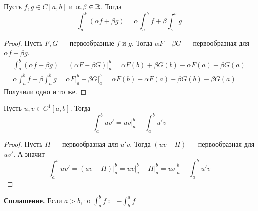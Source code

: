 \begin{theorem}
    Пусть $f, g \in C[a, b]$ и $\alpha, \beta \in \mathbb{R}$. Тогда
    \begin{equation*}
    \int_{a}^{b}(\alpha f + \beta g) = \alpha \int_{a}^{b} f + \beta \int_{a}^{b} g
    \end{equation*}
\end{theorem}
\begin{proof}
    Пусть $F, G$ --- первообразные $f$ и $g$. Тогда $\alpha F + \beta G$ --- первообразная для $\alpha f + \beta g$.
    \begin{equation*}
        \begin{gathered}
          \int_{a}^{b}(\alpha f + \beta g) =
          (\alpha F + \beta G) \big|_{a}^{b} =
          \alpha F(b) + \beta G(b) - \alpha F(a) - \beta G(a)\\
          \alpha \int_{a}^{b} f + \beta \int_{a}^{b} g =
          \alpha F \big|_a^{b} + \beta G \big|_{a}^{b} =
          \alpha F(b) - \alpha F(a) + \beta G(b) - \beta G(a)
        \end{gathered}
    \end{equation*}
    Получили одно и то же.
\end{proof}

\begin{theorem}
    Пусть $u, v \in C^{1}[a, b]$. Тогда
    \begin{equation*}
        \int_{a}^{b} uv' = uv \big|_{a}^{b} - \int_{a}^{b} u'v
    \end{equation*}
\end{theorem}
\begin{proof}
  Пусть $H$ --- первообразная для $u'v$. Тогда $(uv - H)$ --- первообразная для $uv'$. А значит
  \begin{equation*}
    \int_{a}^{b} uv' = (uv - H) \big|_{a}^{b} = uv \big|_{a}^{b} - H \big|_{a}^{b} = uv|_{a}^{b} - \int_{a}^{b} u'v
  \end{equation*}
\end{proof}

\textbf{Соглашение.} Если $a > b$, то $\displaystyle \int_{a}^{b} f \coloneqq -\int_{b}^{a} f$

